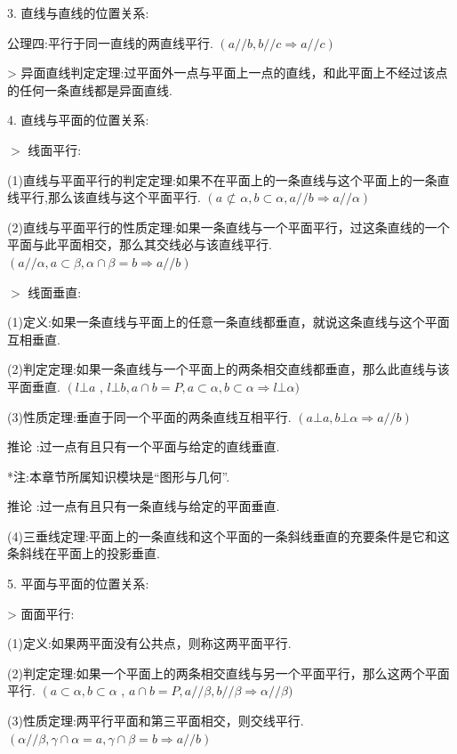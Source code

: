 3. 直线与直线的位置关系:

公理四:平行于同一直线的两直线平行. $\left( {a//b,b//c \Rightarrow  a//c}\right)$

> 异面直线判定定理:过平面外一点与平面上一点的直线，和此平面上不经过该点的任何一条直线都是异面直线.

4. 直线与平面的位置关系:

$>$ 线面平行:

(1)直线与平面平行的判定定理:如果不在平面上的一条直线与这个平面上的一条直线平行,那么该直线与这个平面平行. $\left( {a \text{ ⊄ } \alpha ,b \subset  \alpha ,a//b \Rightarrow  a//\alpha }\right)$

(2)直线与平面平行的性质定理:如果一条直线与一个平面平行，过这条直线的一个平面与此平面相交，那么其交线必与该直线平行. $\left( {a//\alpha ,a \subset  \beta ,\alpha  \cap  \beta  = b \Rightarrow  a//b}\right)$

$>$ 线面垂直:

(1)定义:如果一条直线与平面上的任意一条直线都垂直，就说这条直线与这个平面互相垂直.

(2)判定定理:如果一条直线与一个平面上的两条相交直线都垂直，那么此直线与该平面垂直. $\left( {l \bot  a}\right.$ , $l \bot  b,a \cap  b = P,a \subset  \alpha ,b \subset  \alpha  \Rightarrow  l \bot  \alpha )$

(3)性质定理:垂直于同一个平面的两条直线互相平行. $\left( {a \bot  a,b \bot  \alpha  \Rightarrow  a//b}\right)$

推论  :过一点有且只有一个平面与给定的直线垂直.

\HRule

*注:本章节所属知识模块是“图形与几何”.

\HRule

推论  :过一点有且只有一条直线与给定的平面垂直.

(4)三垂线定理:平面上的一条直线和这个平面的一条斜线垂直的充要条件是它和这条斜线在平面上的投影垂直.

5. 平面与平面的位置关系:

> 面面平行:

(1)定义:如果两平面没有公共点，则称这两平面平行.

(2)判定定理:如果一个平面上的两条相交直线与另一个平面平行，那么这两个平面平行. $\left( {a \subset  \alpha ,b \subset  \alpha }\right.$ , $a \cap  b = P,a//\beta ,b//\beta  \Rightarrow  \alpha //\beta )$

(3)性质定理:两平行平面和第三平面相交，则交线平行. $\left( {\alpha //\beta ,\gamma  \cap  \alpha  = a,\gamma  \cap  \beta  = b \Rightarrow  a//b}\right)$

